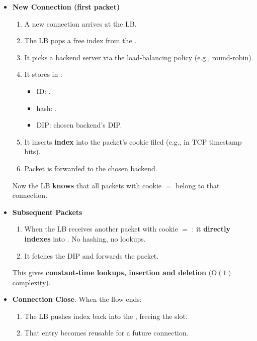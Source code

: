 \newpage

\begin{flushleft}
\end{flushleft}
\begin{itemize}
    \item \textcolor{Green3}{\textbf{New Connection (first packet)}}
    \begin{enumerate}
        \item A new connection arrives at the LB.
        \item The LB pops a free index  from the .
        \item It picks a backend server via the load-balancing policy (e.g., round-robin).
        \item It stores in :
        \begin{itemize}
            \item ID: .
            \item hash: .
            \item DIP: chosen backend's DIP.
        \end{itemize}
        \item It inserts \textbf{index}  into the packet's cookie filed (e.g., in TCP timestamp bits).
        \item Packet is forwarded to the chosen backend.
    \end{enumerate}
    Now the LB \textbf{knows} that all packets with cookie $=$  belong to that connection.


    \item \textcolor{DarkOrange3}{\textbf{Subsequent Packets}}
    \begin{enumerate}
        \item When the LB receives another packet with cookie $=$ : it \textbf{directly indexes} into . No hashing, no lookups.
        \item It fetches the DIP and forwards the packet.
    \end{enumerate}
    This gives \textbf{constant-time lookups, insertion and deletion} ($\text{O}(1)$ complexity).


    \item \textcolor{Red2}{\textbf{Connection Close}}. When the flow ends:
    \begin{enumerate}
        \item The LB pushes index  back into the , freeing the slot.
        \item That entry becomes reusable for a future connection.
    \end{enumerate}
\end{itemize}

